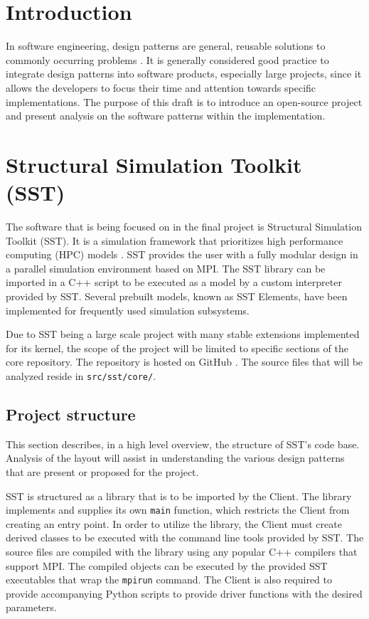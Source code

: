 \section{Introduction}
In software engineering, design patterns are general, reusable solutions to commonly occurring problems \cite{source-making}. It is generally considered good practice to integrate design patterns into software products, especially large projects, since it allows the developers to focus their time and attention towards specific implementations. The purpose of this draft is to introduce an open-source project and present analysis on the software patterns within the implementation.

\section{Structural Simulation Toolkit (SST)}
The software that is being focused on in the final project is Structural Simulation Toolkit (SST). It is a simulation framework that prioritizes high performance computing (HPC) models \cite{sst}. SST provides the user with a fully modular design in a parallel simulation environment based on MPI. The SST library can be imported in a C++ script to be executed as a model by a custom interpreter provided by SST. Several prebuilt models, known as SST Elements, have been implemented for frequently used simulation subsystems.

Due to SST being a large scale project with many stable extensions implemented for its kernel, the scope of the project will be limited to specific sections of the core repository. The repository is hosted on GitHub \cite{sst-repo}. The source files that will be analyzed reside in \texttt{src/sst/core/}.

\subsection{Project structure}
This section describes, in a high level overview, the structure of SST's code base. Analysis of the layout will assist in understanding the various design patterns that are present or proposed for the project.

SST is structured as a library that is to be imported by the Client. The library implements and supplies its own \texttt{main} function, which restricts the Client from creating an entry point. In order to utilize the library, the Client must create derived classes to be executed with the command line tools provided by SST. The source files are compiled with the library using any popular C++ compilers that support MPI. The compiled objects can be executed by the provided SST executables that wrap the \texttt{mpirun} command. The Client is also required to provide accompanying Python scripts to provide driver functions with the desired parameters.

